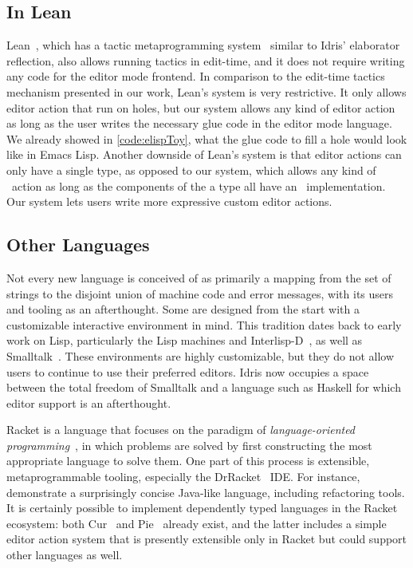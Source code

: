 \subsection{In Lean}

Lean~\cite{lean}, which has a tactic metaprogramming system~\cite{leanmeta}
similar to Idris' elaborator reflection, also allows running tactics in
edit-time, and it does not require writing any code for the editor mode
frontend.
In comparison to the edit-time tactics mechanism presented in our work, Lean's
system is very restrictive. It only allows editor action that run on holes, but
our system allows any kind of editor action as long as the user writes the
necessary glue code in the editor mode language. We already showed in
\autoref{code:elispToy}, what the glue code to fill a hole would look like in
Emacs Lisp. Another downside of Lean's system is that editor actions can only
have a single type, as opposed to our system, which allows any kind of
\Elab\ action as long as the components of the a type all have an
\Editorable\ implementation. Our system lets users write more expressive custom
editor actions.

\subsection{Other Languages}

Not every new language is conceived of as primarily a mapping from the
set of strings to the disjoint union of machine code and error
messages, with its users and tooling as an afterthought. Some are
designed from the start with a customizable interactive environment in
mind. This tradition dates back to early work on Lisp, particularly
the Lisp machines and Interlisp-D~\citep{LispHist}, as well as
Smalltalk~\citep{Goldberg1984SmalltalkEnv}. These environments are
highly customizable, but they do not allow users to continue to use
their preferred editors. Idris now occupies a space between the total
freedom of Smalltalk and a language such as Haskell for which editor
support is an afterthought.

Racket is a language that focuses on the paradigm of
\emph{language-oriented programming}~\citep{racketManifesto}, in which
problems are solved by first constructing the most appropriate
language to solve them. One part of this process is extensible,
metaprogrammable tooling, especially the DrRacket~\cite{revenge}
IDE. For instance, \citet{feltey2016languages} demonstrate a
surprisingly concise Java-like language, including refactoring tools.
It is certainly possible to implement dependently typed languages in
the Racket ecosystem: both Cur~\cite{cur} and
Pie~\cite{theLittleTyper} already exist, and the latter includes a
simple editor action system that is presently extensible only in
Racket but could support other languages as well.

